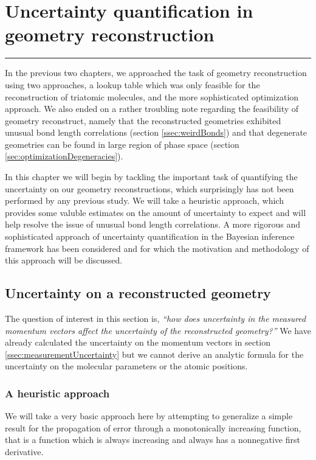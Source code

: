 \chapter{Uncertainty quantification in geometry reconstruction} \label{ch:uncertainty}

\vspace{-1.5 em}
\begin{addmargin}[-0.5cm]{0cm}
  \minitoc
\end{addmargin}
\hrule
\vspace{1.5 em}

In the previous two chapters, we approached the task of geometry reconstruction using two approaches, a lookup table which was only feasible for the reconstruction of triatomic molecules, and the more sophisticated optimization approach. We also ended on a rather troubling note regarding the feasibility of geometry reconstruct, namely that the reconstructed geometries exhibited unusual bond length correlations (section \ref{ssec:weirdBonds}) and that degenerate geometries can be found in large region of phase space (section \ref{sec:optimizationDegeneracies}).

In this chapter we will begin by tackling the important task of quantifying the uncertainty on our geometry reconstructions, which surprisingly has not been performed by any previous study. We will take a heuristic approach, which provides some valuble estimates on the amount of uncertainty to expect and will help resolve the issue of unusual bond length correlations. A more rigorous and sophisticated approach of uncertainty quantification in the Bayesian inference framework has been considered and for which the motivation and methodology of this approach will be discussed.

\section{Uncertainty on a reconstructed geometry} \label{sec:heuristicApproach}
The question of interest in this section is, \textit{``how does uncertainty in the measured momentum vectors affect the uncertainty of the reconstructed geometry?''} We have already calculated the uncertainty on the momentum vectors in section \ref{ssec:measurementUncertainty} but we cannot derive an analytic formula for the uncertainty on the molecular parameters or the atomic positions.

\subsection{A heuristic approach}
We will take a very basic approach here by attempting to generalize a simple result for the propagation of error through a monotonically increasing function, that is a function which is always increasing and always has a nonnegative first derivative.

